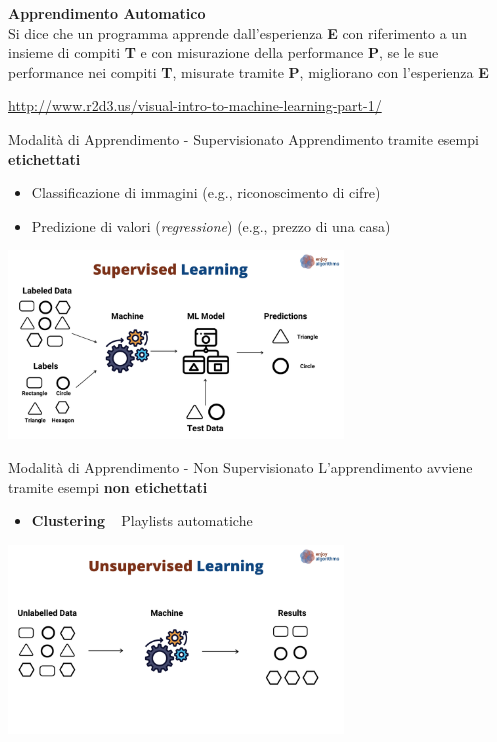 \documentclass[presentation, 10pt,aspectratio=169]{beamer}\mode<presentation>{\usetheme{AMSBolognaFC}}
\begin{document}
	{

	
	\begin{frame}[c]
		
		{
		\color{customfg}
	
		\begin{center}
		\Large\textbf{Apprendimento Automatico} \\
		\large{
		Si dice che un programma apprende dall’esperienza \textbf{E} con riferimento a un insieme di compiti \textbf{T} e con misurazione della performance \textbf{P}, se le sue performance nei compiti \textbf{T}, misurate tramite \textbf{P}, migliorano con l’esperienza \textbf{E}}
		\end{center}

		\url{http://www.r2d3.us/visual-intro-to-machine-learning-part-1/}
	
		\vspace{1cm}	
	}
\end{frame}
}
\begin{frame}{Modalità di Apprendimento - Supervisionato}
	Apprendimento tramite esempi \textbf{etichettati}
	\begin{itemize}
		\item Classificazione di immagini (e.g., riconoscimento di cifre)
		\item Predizione di valori (\emph{regressione}) (e.g., prezzo di una casa)
	\end{itemize}
	\centering

	\includegraphics[height=5cm]{img/supervised-learning.png}
\end{frame}

\begin{frame}{Modalità di Apprendimento - Non Supervisionato}
	L'apprendimento avviene tramite esempi \textbf{non etichettati}
	\begin{itemize}
		\item \textbf{Clustering} \faArrowRight ~ Playlists automatiche
	\end{itemize}
	\centering
	\includegraphics[height=5cm]{img/unsupervised-learning.png}
\end{frame}
\end{document}
